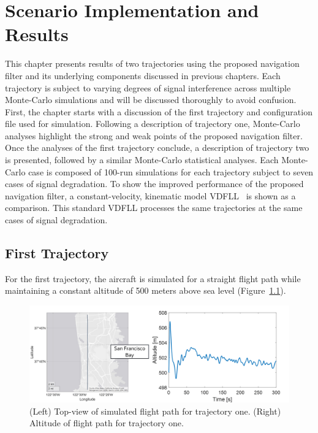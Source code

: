 \chapter{\textbf{Scenario Implementation and Results}}
This chapter presents results of two trajectories using the proposed navigation filter and its underlying components discussed in previous chapters. Each trajectory is subject to varying degrees of signal interference across multiple Monte-Carlo simulations and will be discussed thoroughly to avoid confusion. First, the chapter starts with a discussion of the first trajectory and configuration file used for simulation. Following a description of trajectory one, Monte-Carlo analyses highlight the strong and weak points of the proposed navigation filter. Once the analyses of the first trajectory conclude, a description of trajectory two is presented, followed by a similar Monte-Carlo statistical analyses. Each Monte-Carlo case is composed of 100-run simulations for each trajectory subject to seven cases of signal degradation. To show the improved performance of the proposed navigation filter, a constant-velocity, kinematic model VDFLL~\cite{grierPositionNavigationTiming} is shown as a comparison. This standard VDFLL processes the same trajectories at the same cases of signal degradation.

\section{\textbf{First Trajectory}}
For the first trajectory, the aircraft is simulated for a straight flight path while maintaining a constant altitude of 500 meters above sea level (Figure~\ref{fig:trajectory1}).

\begin{figure}[!ht]
    \centering
    \includegraphics[width=\linewidth]{Figures/Results/trajectory1.png}
    \caption{(Left) Top-view of simulated flight path for trajectory one. (Right) Altitude of flight path for trajectory one.}\label{fig:trajectory1}
\end{figure}

